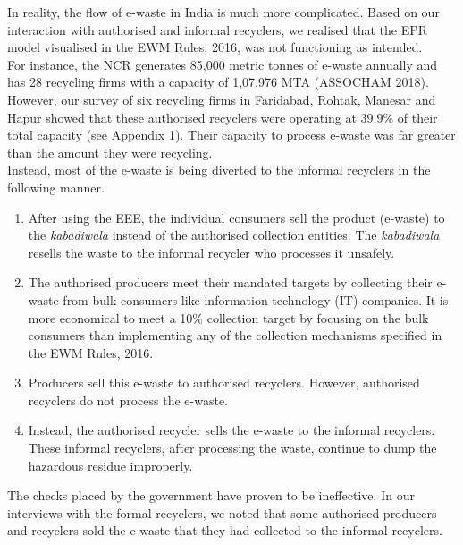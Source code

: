 \documentclass[a4paper, 12pt]{article}
\begin{document}
                    In reality, the flow of e-waste in India is much more complicated. Based on our interaction with authorised and informal recyclers, we realised that the EPR model visualised in the EWM Rules, 2016, was not functioning as intended.\\ 
                    
                    For instance, the NCR generates 85,000 metric tonnes of e-waste annually and has 28 recycling firms with a capacity of 1,07,976 MTA (ASSOCHAM 2018). However, our survey of six recycling firms in Faridabad, Rohtak, Manesar and Hapur showed that these authorised recyclers were operating at 39.9\% of their total capacity (see Appendix 1). Their capacity to process e-waste was far greater than the amount they were recycling. \\
                    
                    Instead, most of the e-waste is being diverted to the informal recyclers in the following manner.                    
                    \begin{enumerate}
                      \item After using the EEE, the individual consumers sell the product (e-waste) to the \textit{kabadiwala} instead of the authorised collection entities. The \textit{kabadiwala} resells the waste to the informal recycler who processes it unsafely. 
                      \item The authorised producers meet their mandated targets by collecting their e-waste from bulk consumers like information technology (IT) companies. It is more economical to meet a 10\% collection target by focusing on the bulk consumers than implementing any of the collection mechanisms specified in the EWM Rules, 2016.
                      \item Producers sell this e-waste to authorised recyclers. However, authorised recyclers do not process the e-waste.  
                      \item Instead, the authorised recycler sells the e-waste to the informal recyclers. These informal recyclers, after processing the waste, continue to dump the hazardous residue improperly.
                    \end{enumerate}
                    
                    The checks placed by the government have proven to be ineffective. In our interviews with the formal recyclers, we noted that some authorised producers and recyclers sold the e-waste that they had collected to the informal recyclers. \\
                    
\end{document}
